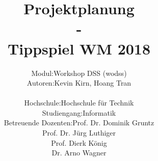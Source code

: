 \documentclass[11pt, a4paper]{report}
\begin{document}
	\title{\textbf{Projektplanung}\\- \\Tippspiel WM 2018}
	\author{
			\begin{tabular}{l  l}
				Modul: & Workshop DSS (wodss)\\
				Autoren: & Kevin Kirn, Hoang Tran\\ \\
				Hochschule: & Hochschule für Technik\\
				Studiengang: & Informatik\\
				Betreuende Dozenten: & Prof. Dr. Dominik Gruntz\\
				& Prof. Dr. Jürg Luthiger\\
				& Prof. Dierk König\\
				& Dr. Arno Wagner
			\end{tabular}
	}
	
	\maketitle
	\tableofcontents
	
	
	
	
	
	
\end{document}
